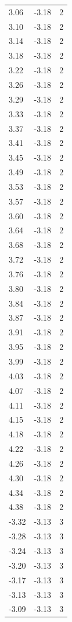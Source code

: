\begin{longtable}{lrr}
  3.06 & -3.18 & 2 \\
  3.10 & -3.18 & 2 \\
  3.14 & -3.18 & 2 \\
  3.18 & -3.18 & 2 \\
  3.22 & -3.18 & 2 \\
  3.26 & -3.18 & 2 \\
  3.29 & -3.18 & 2 \\
  3.33 & -3.18 & 2 \\
  3.37 & -3.18 & 2 \\
  3.41 & -3.18 & 2 \\
  3.45 & -3.18 & 2 \\
  3.49 & -3.18 & 2 \\
  3.53 & -3.18 & 2 \\
  3.57 & -3.18 & 2 \\
  3.60 & -3.18 & 2 \\
  3.64 & -3.18 & 2 \\
  3.68 & -3.18 & 2 \\
  3.72 & -3.18 & 2 \\
  3.76 & -3.18 & 2 \\
  3.80 & -3.18 & 2 \\
  3.84 & -3.18 & 2 \\
  3.87 & -3.18 & 2 \\
  3.91 & -3.18 & 2 \\
  3.95 & -3.18 & 2 \\
  3.99 & -3.18 & 2 \\
  4.03 & -3.18 & 2 \\
  4.07 & -3.18 & 2 \\
  4.11 & -3.18 & 2 \\
  4.15 & -3.18 & 2 \\
  4.18 & -3.18 & 2 \\
  4.22 & -3.18 & 2 \\
  4.26 & -3.18 & 2 \\
  4.30 & -3.18 & 2 \\
  4.34 & -3.18 & 2 \\
  4.38 & -3.18 & 2 \\
  -3.32 & -3.13 & 3 \\
  -3.28 & -3.13 & 3 \\
  -3.24 & -3.13 & 3 \\
  -3.20 & -3.13 & 3 \\
  -3.17 & -3.13 & 3 \\
  -3.13 & -3.13 & 3 \\
  -3.09 & -3.13 & 3 \\

\end{longtable}
